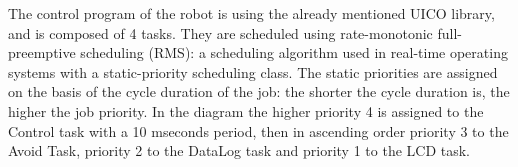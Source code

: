 \begin{figure}[ht]
  \begin{center}
	\hspace{1pt}
  \end{center}
\end{figure}
The control program of the robot is using the already mentioned UICO library, and is composed of 4 tasks. They are scheduled using rate-monotonic full-preemptive scheduling (RMS): a scheduling algorithm used in real-time operating systems with a static-priority scheduling class.
The static priorities are assigned on the basis of the cycle duration of the job: the shorter the cycle duration is, the higher the job priority. In the diagram the higher priority 4 is assigned to the Control task with a 10 mseconds period, then in ascending order priority 3 to the Avoid Task, priority 2 to the DataLog task and priority 1 to the LCD task.

